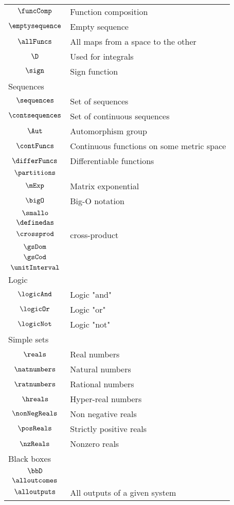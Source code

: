 \begin{longtable}{cl}
 $\funcComp$ &  Function composition\\ 
 $\emptysequence$ &  Empty sequence\\ 
 $\allFuncs$ &  All maps from a space to the other\\ 
 $\D$ &  Used for integrals\\ 
 $\sign$ &  Sign function\\ 
 \multicolumn{2}{l}{Sequences}\\ 
 \hline
$\sequences$ &  Set of sequences\\ 
 $\contsequences$ &  Set of continuous sequences\\ 
 $\Aut$ &  Automorphism group\\ 
 $\contFuncs$ &  Continuous functions on some metric space \\ 
 $\differFuncs$ &  Differentiable functions\\ 
 $\partitions$ & \\ 
 $\mExp$ &  Matrix exponential\\ 
 $\bigO$ &  Big-O notation\\ 
 $\smallo$ & \\ 
 $\definedas$ & \\ 
 $\crossprod$ &  cross-product\\ 
 $\gsDom$ &  \\ 
 $\gsCod$ &  \\ 
 $\unitInterval$ & \\ 
 \multicolumn{2}{l}{Logic}\\ 
 \hline
$\logicAnd$ &  Logic "and"\\ 
 $\logicOr$ &  Logic "or"\\ 
 $\logicNot$ &  Logic "not"\\ 
 \multicolumn{2}{l}{Simple sets}\\ 
 \hline
$\reals$ &  Real numbers\\ 
 $\natnumbers$ &  Natural numbers\\ 
 $\ratnumbers$ &  Rational numbers\\ 
 $\hreals$ &  Hyper-real numbers\\ 
 $\nonNegReals$ &  Non negative reals \\ 
 $\posReals$ &  Strictly positive reals\\ 
 $\nzReals$ &  Nonzero reals\\ 
 \multicolumn{2}{l}{Black boxes}\\ 
 \hline
$\bbD$ & \\ 
 $\alloutcomes$ & \\ 
 $\alloutputs$ &  All outputs of a given system\\ 

\end{longtable}
